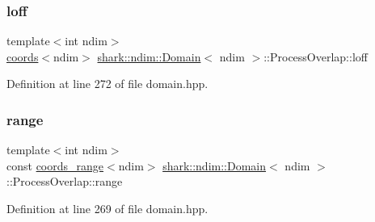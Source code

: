 \hypertarget{classshark_1_1ndim_1_1_domain_1_1_process_overlap_aedfe1a1b3943d517faa3203f201bbc10}{}\label{classshark_1_1ndim_1_1_domain_1_1_process_overlap_aedfe1a1b3943d517faa3203f201bbc10} 
\subsubsection{\texorpdfstring{loff}{loff}}
{\footnotesize\ttfamily template$<$int ndim$>$ \\
\hyperlink{structshark_1_1ndim_1_1coords}{coords}$<$ndim$>$ \hyperlink{classshark_1_1ndim_1_1_domain}{shark\+::ndim\+::\+Domain}$<$ ndim $>$\+::Process\+Overlap\+::loff\hspace{0.3cm}{\ttfamily [private]}}



Definition at line 272 of file domain.\+hpp.

\hypertarget{classshark_1_1ndim_1_1_domain_1_1_process_overlap_a1130b73407bf2aaa0a8cb6ac25fcb3c1}{}\label{classshark_1_1ndim_1_1_domain_1_1_process_overlap_a1130b73407bf2aaa0a8cb6ac25fcb3c1} 
\subsubsection{\texorpdfstring{range}{range}}
{\footnotesize\ttfamily template$<$int ndim$>$ \\
const \hyperlink{structshark_1_1ndim_1_1coords__range}{coords\+\_\+range}$<$ndim$>$ \hyperlink{classshark_1_1ndim_1_1_domain}{shark\+::ndim\+::\+Domain}$<$ ndim $>$\+::Process\+Overlap\+::range\hspace{0.3cm}{\ttfamily [private]}}



Definition at line 269 of file domain.\+hpp.

\hypertarget{classshark_1_1ndim_1_1_domain_1_1_process_overlap_acf20a1ff561cd7b0f50f8f6983cc6283}{}\label{classshark_1_1ndim_1_1_domain_1_1_process_overlap_acf20a1ff561cd7b0f50f8f6983cc6283} 
